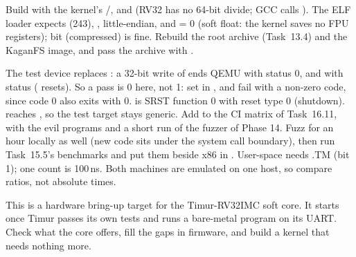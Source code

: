 \documentclass[11pt,a4paper]{article}
\begin{document}
Build with the kernel's /,  and  (RV32 has no 64-bit
divide; GCC calls ). The ELF loader expects  (243), , little-endian,
and  = 0 (soft float: the kernel saves no FPU registers); bit  (compressed) is fine.
Rebuild the root archive (Task~13.4) and the KaganFS image, and pass the archive with .

The test device replaces : a 32-bit write of  ends QEMU with status 0, and
 with status  ( resets). So a pass is 0 here, not 1: set  in
, and fail with a non-zero code, since code 0 also exits with 0.  is SRST function 0 with reset type 0 (shutdown).  reaches
, so the test target stays generic. Add  to the CI matrix of Task~16.11, with the
evil programs and a short run of the fuzzer of Phase 14. Fuzz for an hour locally as well (new code sits under the
system call boundary), then run Task~15.5's benchmarks and put them beside x86 in . User-space 
needs .TM (bit 1); one count is 100\,ns. Both machines are emulated on one host, so compare ratios, not
absolute times.

This is a hardware bring-up target for the Timur-RV32IMC soft core. It starts once Timur passes its own tests and
runs a bare-metal program on its UART. Check what the core offers, fill the gaps in firmware, and build a kernel that needs nothing more.
\end{document}
